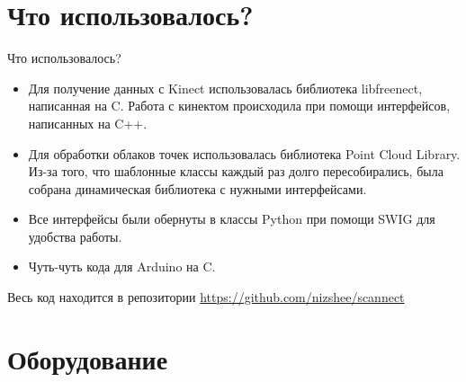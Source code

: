 \documentclass{beamer}
\begin{document}
\section{Что использовалось?}

\begin{frame}{Что использовалось?}
    \begin{itemize}
        \item Для получение данных с Kinect использовалась библиотека libfreenect, написанная на C. Работа с кинектом происходила при помощи интерфейсов, написанных на C++.
        \item Для обработки облаков точек использовалась библиотека Point Cloud Library. Из-за того, что шаблонные классы каждый раз долго пересобирались, была собрана динамическая библиотека с нужными интерфейсами.
        \item Все интерфейсы были обернуты в классы Python при помощи SWIG для удобства работы.
        \item Чуть-чуть кода для Arduino на C.
    \end{itemize}

    Весь код находится в репозитории \href{https://github.com/nizshee/scannect}{\color{blue}https://github.com/nizshee/scannect}
\end{frame}


\section{Оборудование}
\end{document}
